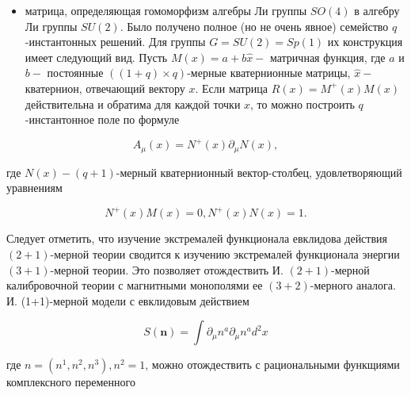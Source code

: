 \documentclass[10pt]{article}
\begin{document}
\begin{itemize}

  \item матрица, определяющая гомоморфизм алгебры Ли группы $S O(4)$ в алгебру Ли группы $S U(2)$. Было получено полное (но не очень явное) семейство $q$-инстантонных решений. Для группы $G=S U(2)=S p(1)$ их конструкция имеет следующий вид. Пусть $M(x)=a+b \hat{x}-$ матричная функция, где $a$ и $b-$ постоянные $((1+q) \times q)$-мерные кватернионные матрицы, $\hat{x}-$ кватернион, отвечающий вектору $x$. Если матрица $R(x)=M^{+}(x) M(x)$ действительна и обратима для каждой точки $x$, то можно построить $q$-инстантонное поле по формуле

\end{itemize}



\[

A_{\mu}(x)=N^{+}(x) \partial_{\mu} N(x),

\]



где $N(x)-(q+1)$-мерный кватернионный вектор-столбец, удовлетворяющий уравнениям



\[

N^{+}(x) M(x)=0, N^{+}(x) N(x)=1 .

\]



Следует отметить, что изучение экстремалей функционала евклидова действия $(2+1)$-мерной теории сводится к изучению экстремалей функционала энергии $(3+1)$-мерной теории. Это позволяет отождествить И. $(2+1)$-мерной калибровочной теории с магнитными монополями ее $(3+2)$-мерного аналога. И. (1+1)-мерной модели с евклидовым действием



\[

S(\boldsymbol{n})=\int \partial_{\mu} n^{a} \partial_{\mu} n^{a} d^{2} x

\]



где $n=\left(n^{1}, n^{2}, n^{3}\right), n^{2}=1$, можно отождествить с рациональными функщиями комплексного переменного
\end{document}
